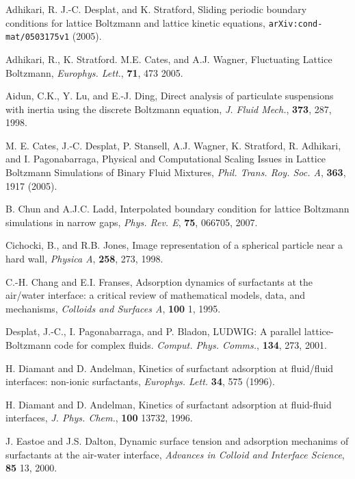 \begin{thebibliography}{99}

Adhikari, R. J.-C. Desplat, and K. Stratford,
Sliding periodic boundary conditions for lattice Boltzmann and lattice
kinetic equations,
\texttt{arXiv:cond-mat/0503175v1} (2005).

Adhikari, R., K. Stratford. M.E. Cates, and A.J. Wagner,
Fluctuating Lattice Boltzmann,
\textit{Europhys. Lett.}, \textbf{71}, 473 2005.

Aidun, C.K., Y. Lu, and E.-J. Ding,
Direct analysis of particulate suspensions with inertia using the
discrete Boltzmann equation,
\textit{J. Fluid Mech.}, \textbf{373}, 287, 1998.

M. E. Cates, J.-C. Desplat, P. Stansell, A.J. Wagner, K. Stratford,
R. Adhikari, and I. Pagonabarraga,
Physical and Computational Scaling Issues in Lattice Boltzmann
Simulations of Binary Fluid Mixtures,
\textit{Phil. Trans. Roy. Soc. A}, \textbf{363}, 1917 (2005). 

B. Chun and A.J.C. Ladd,
Interpolated boundary condition for lattice Boltzmann simulations in
narrow gaps,
\textit{Phys. Rev. E}, \textbf{75}, 066705, 2007.

Cichocki, B., and R.B. Jones,
Image representation of a spherical particle near a hard wall,
\textit{Physica A}, \textbf{258}, 273, 1998.

C.-H. Chang and E.I. Franses,
Adsorption dynamics of surfactants at the air/water interface:
a critical review of mathematical models, data, and mechanisms,
\textit{Colloids and Surfaces A}, \textbf{100} 1, 1995.

Desplat, J.-C., I. Pagonabarraga, and P. Bladon,
LUDWIG: A parallel lattice-Boltzmann code for complex fluids.
\textit{Comput. Phys. Comms.}, \textbf{134}, 273, 2001.

H. Diamant and D. Andelman,
Kinetics of surfactant adsorption at fluid/fluid
interfaces: non-ionic surfactants,
\textit{Europhys. Lett.} \textbf{34}, 575 (1996).

H. Diamant and D. Andelman,
Kinetics of surfactant adsorption at fluid-fluid interfaces,
\textit{J. Phys. Chem.}, \textbf{100} 13732, 1996.

J. Eastoe and J.S. Dalton,
Dynamic surface tension and adsorption mechanims of surfactants
at the air-water interface,
\textit{Advances in Colloid and Interface Science}, \textbf{85}
13, 2000.


\end{thebibliography}
